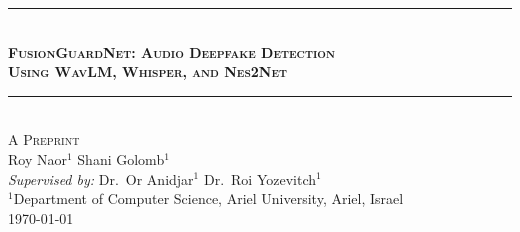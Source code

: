 \documentclass[11pt,a4paper]{article}
\begin{document}
\begin{center}

\rule{\linewidth}{1.5pt}\\[0.4em]
{\LARGE\bfseries\scshape
  FusionGuardNet: Audio Deepfake Detection\\[0.35em]
  Using WavLM, Whisper, and Nes2Net
}\\[0.4em]
\rule{\linewidth}{0.8pt}\\[1.0em]

{\small\scshape A Preprint}\\[1.2em]

{\normalsize
  Roy Naor$^{1}$ \quad Shani Golomb$^{1}$
}\\[0.5em]

{\normalsize
  \textit{Supervised by:} Dr.\ Or Anidjar$^{1}$ \quad Dr.\ Roi Yozevitch$^{1}$
}\\[0.7em]

{\small
  $^{1}$Department of Computer Science, Ariel University, Ariel, Israel
}\\[0.8em]

{\small \today}

\end{center}

\vspace{0.5em}
\end{document}

